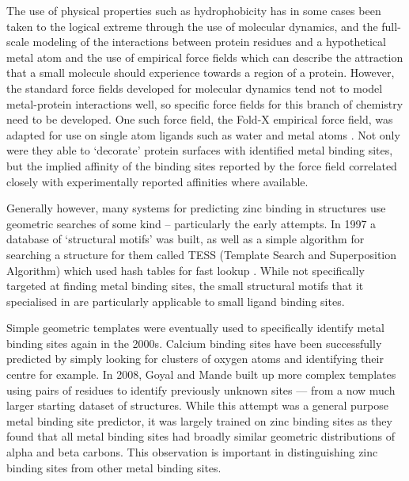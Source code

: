 The use of physical properties such as hydrophobicity has in some cases been taken to the logical extreme through the use of molecular dynamics, and the full-scale modeling of the interactions between protein residues and a hypothetical metal atom and the use of empirical force fields which can describe the attraction that a small molecule should experience towards a region of a protein. However, the standard force fields developed for molecular dynamics tend not to model metal-protein interactions well, so specific force fields for this branch of chemistry need to be developed. One such force field, the Fold-X empirical force field, was adapted for use on single atom ligands such as water and metal atoms \cite{schymkowitz2005}. Not only were they able to `decorate' protein surfaces with identified metal binding sites, but the implied affinity of the binding sites reported by the force field correlated closely with experimentally reported affinities where available.

Generally however, many systems for predicting zinc binding in structures use geometric searches of some kind -- particularly the early attempts. In 1997 a database of `structural motifs' was built, as well as a simple algorithm for searching a structure for them called TESS (Template Search and Superposition Algorithm) which used hash tables for fast lookup \cite{wallace1997tess}. While not specifically targeted at finding metal binding sites, the small structural motifs that it specialised in are particularly applicable to small ligand binding sites.

Simple geometric templates were eventually used to specifically identify metal binding sites again in the 2000s. Calcium binding sites have been successfully predicted by simply looking for clusters of oxygen atoms and identifying their centre \cite{deng2006} for example. In 2008, Goyal and Mande built up more complex templates using pairs of residues to identify previously unknown sites --- from a now much larger starting dataset of structures. While this attempt was a general purpose metal binding site predictor, it was largely trained on zinc binding sites as they found that all metal binding sites had broadly similar geometric distributions of alpha and beta carbons. This observation is important in distinguishing zinc binding sites from other metal binding sites.

